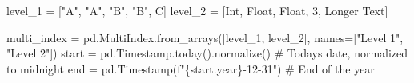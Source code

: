 \documentclass[
  12pt,
  a4paper,
  DIV=11,
  numbers=noendperiod]{scrartcl}
\newenvironment{Shaded}{\begin{snugshade}}{\end{snugshade}}
\newcommand{\CommentTok}[1]{\textcolor[rgb]{0.37,0.37,0.37}{#1}}
\newcommand{\DecValTok}[1]{\textcolor[rgb]{0.68,0.00,0.00}{#1}}
\newcommand{\NormalTok}[1]{\textcolor[rgb]{0.00,0.23,0.31}{#1}}
\newcommand{\OperatorTok}[1]{\textcolor[rgb]{0.37,0.37,0.37}{#1}}
\newcommand{\SpecialCharTok}[1]{\textcolor[rgb]{0.37,0.37,0.37}{#1}}
\newcommand{\SpecialStringTok}[1]{\textcolor[rgb]{0.13,0.47,0.30}{#1}}
\newcommand{\StringTok}[1]{\textcolor[rgb]{0.13,0.47,0.30}{#1}}
\begin{document}
\begin{Shaded}
\begin{Highlighting}[]
\NormalTok{level\_1 }\OperatorTok{=}\NormalTok{ [}\StringTok{"A"}\NormalTok{, }\StringTok{"A"}\NormalTok{, }\StringTok{"B"}\NormalTok{, }\StringTok{"B"}\NormalTok{, }\StringTok{\textquotesingle{}C\textquotesingle{}}\NormalTok{]}
\NormalTok{level\_2 }\OperatorTok{=}\NormalTok{ [}\StringTok{\textquotesingle{}Int\textquotesingle{}}\NormalTok{, }\StringTok{\textquotesingle{}Float\textquotesingle{}}\NormalTok{, }\StringTok{\textquotesingle{}Float\textquotesingle{}}\NormalTok{, }\DecValTok{3}\NormalTok{, }\StringTok{\textquotesingle{}Longer Text\textquotesingle{}}\NormalTok{]}

\NormalTok{multi\_index }\OperatorTok{=}\NormalTok{ pd.MultiIndex.from\_arrays([level\_1, level\_2],}
\NormalTok{        names}\OperatorTok{=}\NormalTok{[}\StringTok{"Level 1"}\NormalTok{, }\StringTok{"Level 2"}\NormalTok{])}
\NormalTok{start }\OperatorTok{=}\NormalTok{ pd.Timestamp.today().normalize()  }\CommentTok{\# Today\textquotesingle{}s date, normalized to midnight}
\NormalTok{end }\OperatorTok{=}\NormalTok{ pd.Timestamp(}\SpecialStringTok{f"}\SpecialCharTok{\{}\NormalTok{start}\SpecialCharTok{.}\NormalTok{year}\SpecialCharTok{\}}\SpecialStringTok{{-}12{-}31"}\NormalTok{)  }\CommentTok{\# End of the year}


\end{Highlighting}
\end{Shaded}
\end{document}
